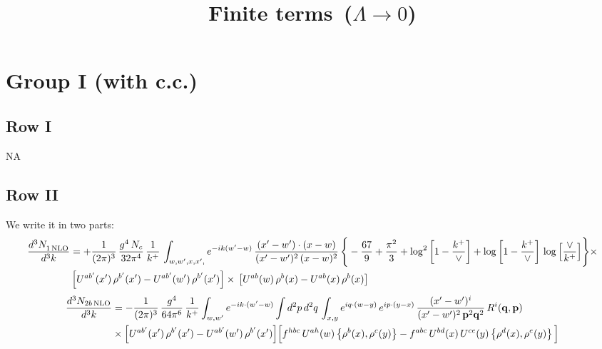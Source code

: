 \documentclass[9pt]{article}
\title{Finite terms\, ($\Lambda\to 0$)}
\author{}
\date{}
\numberwithin{equation}{section}
\begin{document}
\maketitle
\section{Group I (with c.c.)}
\subsection{Row I}
\textsc{NA}
\subsection{Row II}
We write it in two parts:
\begin{align}
     \frac{d^{3}N_{1\,\rm NLO}^{\rm}}{d^{3}k} &  =  +\frac{1}{(2\pi)^{3}}\, \frac{g^{4}\,N_{c}}{32\pi^{4}}\,\frac{1}{k^{+}}\, \int_{w, w',x,x',} e^{-ik(w^\prime-w)}\, \frac{(x'-w')\cdot (x-w)}{(x'-w')^{2}\, (x-w)^{2}}\, \Bigg\{ -\frac{67}{9}+\frac{\pi^{2}}{3}+\log^{2}{\left[1-\frac{k^{+}}{\vee}\right]}+\log{\left[1-\frac{k^{+}}{\vee}\right]}\,\log{\left[\frac{\vee}{k^{+}}\right]}\Bigg\}\times\notag \\ & \left[U^{ab'}(x')\,\rho^{b'}(x') - U^{ab'}(w')\,\rho^{b'}(x')\right]\times\,\left[U^{ab}(w)\,\rho^{b}(x) - U^{ab}(x)\,\rho^{b}(x)\right]
\end{align}  
\begin{align}
\frac{d^{3}N_{2b\,\rm NLO}}{d^{3}k} & = -\frac{1}{(2\pi)^{3}}\,\frac{g^{4}}{64\pi^{6}}\,\frac{1}{k^{+}}\int_{w,w'} e^{-ik\cdot(w'-w)}
\int d^{2}p\,d^{2}q\,\int_{x,y} e^{iq\cdot(w-y)}\,e^{ip\cdot(y-x)}\,\frac{(x'-w')^{i}}{(x'-w')^{2}\,\mathbf{p}^{2}\mathbf{q}^{2}}\,R^{i}(\mathbf{q},\mathbf{p})\notag\\
&\times\Big[U^{ab'}(x')\,\rho^{b'}(x')-U^{ab'}(w')\,\rho^{b'}(x')\Big]
\Big[f^{hbc}\,U^{ah}(w)\left\{\rho^{b}(x),\rho^{c}(y)\right\}-f^{abc}\,U^{bd}(x)\,U^{ce}(y)\left\{\rho^{d}(x),\rho^{e}(y)\right\}\Big]
\end{align}
\end{document}
